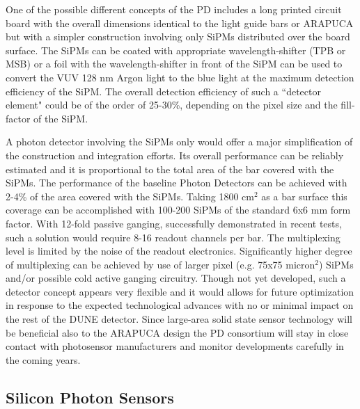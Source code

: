 One of the possible different concepts of the PD includes a long printed circuit board with the overall dimensions identical to the light guide bars or ARAPUCA but with a simpler construction involving only SiPMs distributed over the board surface. The SiPMs can be coated with  appropriate wavelength-shifter (TPB or MSB) or a foil with the wavelength-shifter in front of the SiPM can be used to convert the VUV 128 nm Argon light to the blue light at the maximum detection efficiency of the SiPM. The overall detection efficiency of such a ``detector element" could be of the order of 25-30\%, depending on the pixel size and the fill-factor of the SiPM.

A photon detector involving the SiPMs only would offer a major simplification of the construction and integration efforts. Its overall performance can be reliably estimated and it is proportional to the total area of the bar covered with the SiPMs.
The performance of the baseline Photon Detectors can be achieved with 2-4\% of the area covered with the SiPMs. Taking 1800 cm$^2$ as a bar surface this coverage can be accomplished with 100-200 SiPMs of the standard 6x6 mm form factor. With 12-fold passive ganging, successfully demonstrated in recent tests, such a solution would require 8-16 readout channels per bar. The multiplexing level is limited by the noise of the readout electronics. Significantly higher degree of multiplexing can be achieved by use of larger pixel (e.g. 75x75 micron$^2$) SiPMs and/or possible cold active ganging circuitry. 
Though not yet developed, such a detector concept appears very flexible and it would allows for future optimization in response to the expected technological advances with no or minimal impact on the rest of the DUNE detector.  
Since large-area solid state sensor technology will be beneficial also to the ARAPUCA design the PD consortium will stay in close contact with photosensor manufacturers and monitor developments carefully in the coming years.



\subsection{Silicon Photon Sensors}
\label{sec:fdsp-pd-ps}

